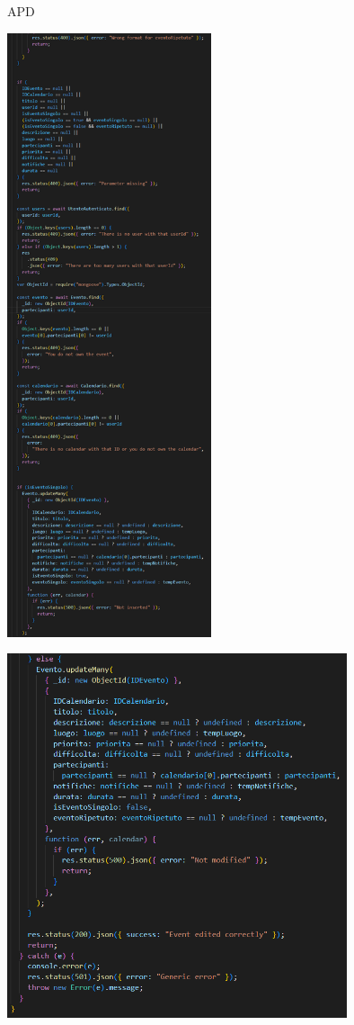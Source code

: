\begin{listaPersonale} {APD}
\begin{listaPersonale2}[APD]{}
\begin{center}
                    \includegraphics[width=0.45\textwidth, height=0.9\textheight]{img/png/APIs/modificaEvento2.png}
                \end{center}
                \begin{center}
                    \includegraphics[width=0.75\textwidth, height=0.6\textheight]{img/png/APIs/modificaEvento3.png}

\end{center}
\end{listaPersonale2}
\end{listaPersonale}
